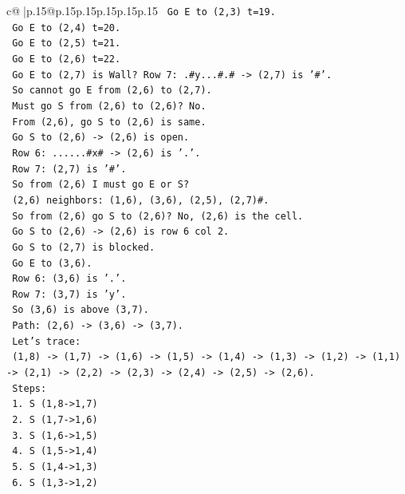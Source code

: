 \documentclass{article}
\begin{document}
{\begin{supertabular}{c@{$\;$}|p{.15\linewidth}@{}p{.15\linewidth}p{.15\linewidth}p{.15\linewidth}p{.15\linewidth}p{.15\linewidth}}
{{{\texttt{    Go E to (2,3) t=19.} \\
\texttt{    Go E to (2,4) t=20.} \\
\texttt{    Go E to (2,5) t=21.} \\
\texttt{    Go E to (2,6) t=22.} \\
\texttt{    Go E to (2,7) is Wall? Row 7: .\#y...\#.\# {-}> (2,7) is '\#'.} \\
\texttt{    So cannot go E from (2,6) to (2,7).} \\
\texttt{    Must go S from (2,6) to (2,6)? No.} \\
\texttt{    From (2,6), go S to (2,6) is same.} \\
\texttt{    Go S to (2,6) {-}> (2,6) is open.} \\
\texttt{    Row 6: ......\#x\# {-}> (2,6) is '.'.} \\
\texttt{    Row 7: (2,7) is '\#'.} \\
\texttt{    So from (2,6) I must go E or S?} \\
\texttt{    (2,6) neighbors: (1,6), (3,6), (2,5), (2,7)\#.} \\
\texttt{    So from (2,6) go S to (2,6)? No, (2,6) is the cell.} \\
\texttt{    Go S to (2,6) {-}> (2,6) is row 6 col 2.} \\
\texttt{    Go S to (2,7) is blocked.} \\
\texttt{    Go E to (3,6).} \\
\texttt{    Row 6: (3,6) is '.'.} \\
\texttt{    Row 7: (3,7) is 'y'.} \\
\texttt{    So (3,6) is above (3,7).} \\
\texttt{    Path: (2,6) {-}> (3,6) {-}> (3,7).} \\
\texttt{    Let's trace:} \\
\texttt{    (1,8) {-}> (1,7) {-}> (1,6) {-}> (1,5) {-}> (1,4) {-}> (1,3) {-}> (1,2) {-}> (1,1) {-}> (2,1) {-}> (2,2) {-}> (2,3) {-}> (2,4) {-}> (2,5) {-}> (2,6).} \\
\texttt{    Steps:} \\
\texttt{    1. S (1,8{-}>1,7)} \\
\texttt{    2. S (1,7{-}>1,6)} \\
\texttt{    3. S (1,6{-}>1,5)} \\
\texttt{    4. S (1,5{-}>1,4)} \\
\texttt{    5. S (1,4{-}>1,3)} \\
\texttt{    6. S (1,3{-}>1,2)} \\
}}}
\end{supertabular}}
\end{document}
